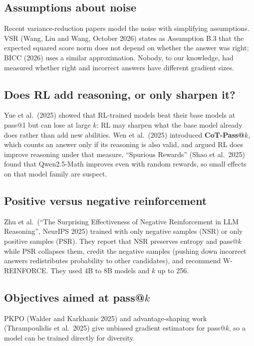 \documentclass[11pt]{article}
\begin{document}
\subsection{Assumptions about noise}
Recent variance-reduction papers model the noise with simplifying assumptions. VSR (Wang, Liu and Wang, October 2026) states as Assumption B.3 that the expected squared score norm does not depend on whether the answer was right; BICC (2026) uses a similar approximation. Nobody, to our knowledge, had measured whether right and incorrect answers have different gradient sizes.

\subsection{Does RL add reasoning, or only sharpen it?}
Yue et al.\ (2025) showed that RL-trained models beat their base models at pass@1 but can lose at large $k$: RL may sharpen what the base model already does rather than add new abilities. Wen et al.\ (2025) introduced \textbf{CoT-Pass@$k$}, which counts an answer only if its reasoning is also valid, and argued RL does improve reasoning under that measure. ``Spurious Rewards'' (Shao et al.\ 2025) found that Qwen2.5-Math improves even with random rewards, so small effects on that model family are suspect.

\subsection{Positive versus negative reinforcement}
Zhu et al.\ (``The Surprising Effectiveness of Negative Reinforcement in LLM Reasoning'', NeurIPS 2025) trained with only negative samples (NSR) or only positive samples (PSR). They report that NSR preserves entropy and pass@$k$ while PSR collapses them, credit the negative samples (pushing down incorrect answers redistributes probability to other candidates), and recommend W-REINFORCE. They used 4B to 8B models and $k$ up to 256.

\subsection{Objectives aimed at pass@\texorpdfstring{$k$}{k}}
PKPO (Walder and Karkhanis 2025) and advantage-shaping work (Thrampoulidis et al.\ 2025) give unbiased gradient estimators for pass@$k$, so a model can be trained directly for diversity.
\end{document}
